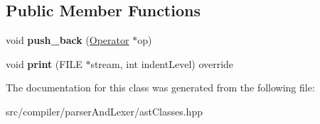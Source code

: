 \subsection*{Public Member Functions}
\begin{DoxyCompactItemize}
\item 
void {\bfseries push\+\_\+back} (\hyperlink{classslang__AST__NODES_1_1Operator}{Operator} $\ast$op)\hypertarget{classslang__AST__NODES_1_1Operators_a5243e6b675f569df2ed4a2afbb073814}{}\label{classslang__AST__NODES_1_1Operators_a5243e6b675f569df2ed4a2afbb073814}

\item 
void {\bfseries print} (F\+I\+LE $\ast$stream, int indent\+Level) override\hypertarget{classslang__AST__NODES_1_1Operators_a981d00f1e44e2f840648993dc99ec781}{}\label{classslang__AST__NODES_1_1Operators_a981d00f1e44e2f840648993dc99ec781}

\end{DoxyCompactItemize}


The documentation for this class was generated from the following file\+:\begin{DoxyCompactItemize}
\item 
src/compiler/parser\+And\+Lexer/ast\+Classes.\+hpp\end{DoxyCompactItemize}
